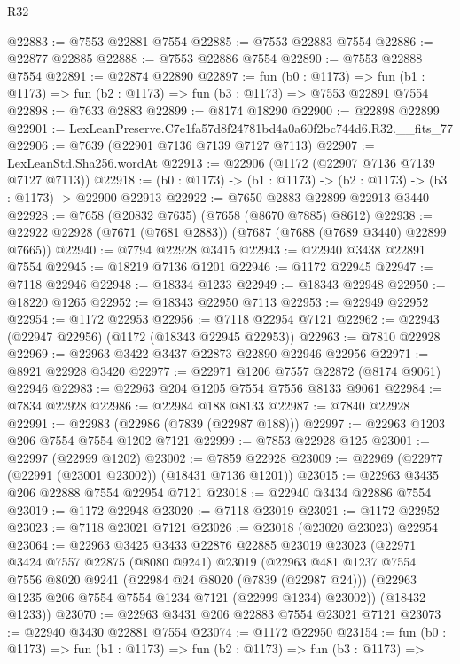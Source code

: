 \begin{lexlean}{R32}
\begin{coremodule}
@22883 := @7553 @22881 @7554
@22885 := @7553 @22883 @7554
@22886 := @22877 @22885
@22888 := @7553 @22886 @7554
@22890 := @7553 @22888 @7554
@22891 := @22874 @22890
@22897 := fun (b0 : @1173) =>
  fun (b1 : @1173) => fun (b2 : @1173) => fun (b3 : @1173) => @7553 @22891 @7554
@22898 := @7633 @2883
@22899 := @8174 @18290
@22900 := @22898 @22899
@22901 := LexLeanPreserve.C7e1fa57d8f24781bd4a0a60f2bc744d6.R32.__fits_77
@22906 := @7639 (@22901 @7136 @7139 @7127 @7113)
@22907 := LexLeanStd.Sha256.wordAt
@22913 := @22906 (@1172 (@22907 @7136 @7139 @7127 @7113))
@22918 := (b0 : @1173) -> (b1 : @1173) -> (b2 : @1173) -> (b3 : @1173) -> @22900 @22913
@22922 := @7650 @2883 @22899 @22913 @3440
@22928 := @7658 (@20832 @7635) (@7658 (@8670 @7885) @8612)
@22938 := @22922 @22928 (@7671 (@7681 @2883)) (@7687 (@7688 (@7689 @3440) @22899 @7665))
@22940 := @7794 @22928 @3415
@22943 := @22940 @3438 @22891 @7554
@22945 := @18219 @7136 @1201
@22946 := @1172 @22945
@22947 := @7118 @22946
@22948 := @18334 @1233
@22949 := @18343 @22948
@22950 := @18220 @1265
@22952 := @18343 @22950 @7113
@22953 := @22949 @22952
@22954 := @1172 @22953
@22956 := @7118 @22954 @7121
@22962 := @22943 (@22947 @22956) (@1172 (@18343 @22945 @22953))
@22963 := @7810 @22928
@22969 := @22963 @3422 @3437 @22873 @22890 @22946 @22956
@22971 := @8921 @22928 @3420
@22977 := @22971 @1206 @7557 @22872 (@8174 @9061) @22946
@22983 := @22963 @204 @1205 @7554 @7556 @8133 @9061
@22984 := @7834 @22928
@22986 := @22984 @188 @8133
@22987 := @7840 @22928
@22991 := @22983 (@22986 (@7839 (@22987 @188)))
@22997 := @22963 @1203 @206 @7554 @7554 @1202 @7121
@22999 := @7853 @22928 @125
@23001 := @22997 (@22999 @1202)
@23002 := @7859 @22928
@23009 := @22969 (@22977 (@22991 (@23001 @23002)) (@18431 @7136 @1201))
@23015 := @22963 @3435 @206 @22888 @7554 @22954 @7121
@23018 := @22940 @3434 @22886 @7554
@23019 := @1172 @22948
@23020 := @7118 @23019
@23021 := @1172 @22952
@23023 := @7118 @23021 @7121
@23026 := @23018 (@23020 @23023) @22954
@23064 := @22963
    @3425
    @3433
    @22876
    @22885
    @23019
    @23023
    (@22971
      @3424
      @7557
      @22875
      (@8080 @9241)
      @23019
      (@22963
        @481
        @1237
        @7554
        @7556
        @8020
        @9241
        (@22984 @24 @8020 (@7839 (@22987 @24)))
        (@22963 @1235 @206 @7554 @7554 @1234 @7121 (@22999 @1234) @23002))
      (@18432 @1233))
@23070 := @22963 @3431 @206 @22883 @7554 @23021 @7121
@23073 := @22940 @3430 @22881 @7554
@23074 := @1172 @22950
@23154 := fun (b0 : @1173) =>
  fun (b1 : @1173) =>
  fun (b2 : @1173) =>
  fun (b3 : @1173) =>

\end{coremodule}
\end{lexlean}
